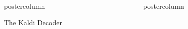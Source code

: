 \documentclass[final,hyperref={pdfpagelabels=false}]{beamer}
\newlength{\columnheight}
\begin{document}
\begin{frame}[fragile]
\begin{columns}
\begin{column}{.33\textwidth}
\begin{beamercolorbox}[center,wd=\textwidth]{postercolumn}
\begin{minipage}[T]{.95\textwidth}
{            \begin{block}{The Kaldi Decoder}
            \end{block}
          }
        \end{minipage}
      \end{beamercolorbox}
    \end{column}

    \begin{column}{.33\textwidth}
      \begin{beamercolorbox}[center,wd=\textwidth]{postercolumn}
        \begin{minipage}[T]{.95\textwidth} %
          \parbox[t][\columnheight]{\textwidth}{ %
            
}
\end{minipage}
\end{beamercolorbox}
\end{column}
\end{columns}
\end{frame}
\end{document}
